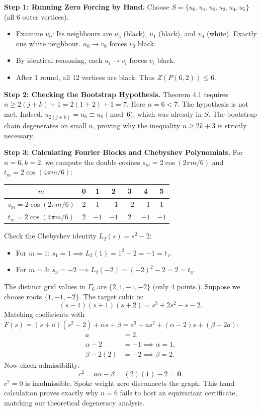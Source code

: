 \documentclass[11pt]{article}
\begin{document}
\noindent\textbf{Step 1: Running Zero Forcing by Hand.}
Choose $S = \{u_0, u_1, u_2, u_3, u_4, u_5\}$ (all 6 outer vertices).
\begin{itemize}[leftmargin=*,nosep]
  \item Examine $u_0$: Its neighbours are $u_5$ (black), $u_1$ (black), and $v_0$ (white).
  Exactly one white neighbour. $u_0 \to v_0$ forces $v_0$ black.
  \item By identical reasoning, each $u_i \to v_i$ forces $v_i$ black.
  \item After 1 round, all 12 vertices are black. Thus $Z(P(6,2)) \le 6$.
\end{itemize}

\noindent\textbf{Step 2: Checking the Bootstrap Hypothesis.}
Theorem 4.1 requires $n \ge 2(j+k) + 1 = 2(1+2) + 1 = 7$.
Here $n = 6 < 7$. The hypothesis is not met. 
Indeed, $u_{2(j+k)} = u_6 \equiv u_0 \pmod 6$, which was already in $S$. The bootstrap chain degenerates on small $n$, proving why the inequality $n \ge 2k+3$ is strictly necessary.

\noindent\textbf{Step 3: Calculating Fourier Blocks and Chebyshev Polynomials.}
For $n=6, k=2$, we compute the double cosines $s_m = 2\cos(2\pi m / 6)$ and $t_m = 2\cos(4\pi m / 6)$:
\begin{center}
\begin{tabular}{c|cccccc}
\toprule
$m$ & 0 & 1 & 2 & 3 & 4 & 5 \\
\midrule
$s_m = 2\cos(2\pi m / 6)$ & 2 & 1 & $-1$ & $-2$ & $-1$ & 1 \\
$t_m = 2\cos(4\pi m / 6)$ & 2 & $-1$ & $-1$ & 2 & $-1$ & $-1$ \\
\bottomrule
\end{tabular}
\end{center}
Check the Chebyshev identity $L_2(s) = s^2 - 2$:
\begin{itemize}[leftmargin=*,nosep]
  \item For $m=1$: $s_1 = 1 \implies L_2(1) = 1^2 - 2 = -1 = t_1$. \checkmark
  \item For $m=3$: $s_3 = -2 \implies L_2(-2) = (-2)^2 - 2 = 2 = t_3$. \checkmark
\end{itemize}
The distinct grid values in $\Gamma_6$ are $\{2, 1, -1, -2\}$ (only 4 points.).
Suppose we choose roots $\{1, -1, -2\}$. The target cubic is:
\begin{equation}
  (s - 1)(s + 1)(s + 2) = s^3 + 2s^2 - s - 2.
\end{equation}
Matching coefficients with $F(s) = (s+a)(s^2-2) + \alpha s + \beta = s^3 + a s^2 + (\alpha - 2) s + (\beta - 2a)$:
\begin{align}
  a &= 2, \\
  \alpha - 2 &= -1 \implies \alpha = 1, \\
  \beta - 2(2) &= -2 \implies \beta = 2.
\end{align}
Now check admissibility:
\begin{equation}
  c^2 = a\alpha - \beta = (2)(1) - 2 = \mathbf{0}.
\end{equation}
$c^2 = 0$ is inadmissible. Spoke weight zero disconnects the graph. 
This hand calculation proves exactly why $n=6$ fails to host an equivariant certificate, matching our theoretical degeneracy analysis.
\end{document}
